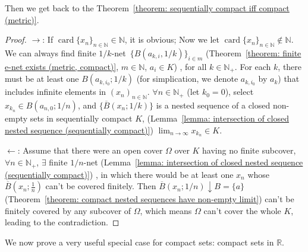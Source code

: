 \documentclass[openany]{book}
\theoremstyle{plain}
\theoremstyle{definition}
\DeclareMathOperator{\card}{card}
\begin{document}
Then we get back to the Theorem~\ref{theorem: sequentially compact iff compact (metric)}. 
\begin{proof}

	$\to$: 
	If $\card \{x_n\}_{n \in \mathbb N} \in \mathbb N$, it is obvious; 
	Now we let $\card \{x_n\}_{n \in \mathbb N} \notin \mathbb N$. 
	We can always find finite $1/k$-net~$\{B(a_{k, i}, 1/k)\}_{i \in m}$
		(Theorem~\ref{theorem: finite e-net exists (metric, compact)}, 
			$m \in \mathbb N$, $a_i \in K$)%
	, for all $k \in \mathbb N_+$. 
	For each $k$, there must be at least one $B(a_{k, i_0}; 1/k)$
		(for simplication, we denote $a_{k, i_0}$ by $a_k$)
	that includes infinite elements in $(x_n)_{n \in \mathbb N}$. 
	$\forall n \in \mathbb N_+$
		(let $k_0 = 0$), 
	select $x_{k_n} \in B(a_{n, 0}; 1/n)$, and $\{\overline B(x_n; 1/k)\}$ is a nested sequence of a closed non-empty sets in sequentially compact $K$,
		(Lemma~\ref{lemma: intersection of closed nested sequence (sequentially compact)})
	$\lim_{n\to \infty} x_{k_n} \in K$.
	
	$\gets$: 
	Assume that there were an open cover $\varOmega$ over $K$ having no finite subcover, $\forall n \in \mathbb N_+$, $\exists$ finite $1/n$-net 
		(Lemma~\ref{lemma: intersection of closed nested sequence (sequentially compact)})%
	, in which there would be at least one $x_n$ whose $\overline B(x_n;\frac{1}{n})$ can't be covered finitely. 
	Then $\overline B(x_n; 1/n) \downarrow B = \{a\}$ 
		(Theorem~\ref{theorem: compact nested sequences have non-empty limit})
	can't be finitely covered by any subcover of $\varOmega$, 
	which means $\varOmega$ can't cover the whole $K$, leading to the contradiction.
\end{proof}

We now prove a very useful special case for compact sets: compact sets in $\mathbb R$.
\end{document}
